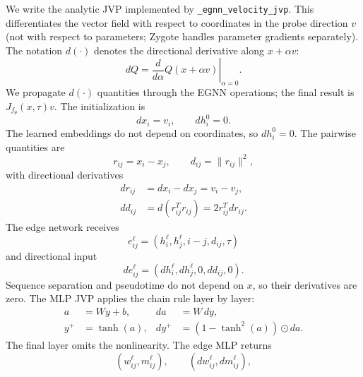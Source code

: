 \documentclass[reprint,amsmath,amssymb,aps,pra,10pt]{revtex4-2}
\begin{document}
We write the analytic JVP implemented by \texttt{\_egnn\_velocity\_jvp}.
This differentiates the vector field with respect to coordinates in the probe direction $v$ (not with respect to parameters; Zygote handles parameter gradients separately).
The notation $d(\cdot)$ denotes the directional derivative along $x+\alpha v$:
\begin{equation}
    dQ
    =
    \left.
    \frac{d}{d\alpha}
    Q(x+\alpha v)
    \right|_{\alpha=0}.
\end{equation}
We propagate $d(\cdot)$ quantities through the EGNN operations; the final result is $J_{f_\theta}(x,\tau)v$.
The initialization is
\begin{equation}
    dx_i=v_i,
    \qquad
    dh_i^0=0.
\end{equation}
The learned embeddings do not depend on coordinates, so $dh_i^0=0$.
The pairwise quantities are
\begin{equation}
    r_{ij}=x_i-x_j,
    \qquad
    d_{ij}=\|r_{ij}\|^2,
\end{equation}
with directional derivatives
\begin{equation}
    \begin{aligned}
        dr_{ij}
        &=
        dx_i-dx_j
        =
        v_i-v_j,
        \\
        dd_{ij}
        &=
        d(r_{ij}^T r_{ij})
        =
        2r_{ij}^Tdr_{ij}.
    \end{aligned}
\end{equation}
The edge network receives
\begin{equation}
    e_{ij}^\ell
    =
    \left(
        h_i^\ell,
        h_j^\ell,
        i-j,
        d_{ij},
        \tau
    \right)
\end{equation}
and directional input
\begin{equation}
    de_{ij}^\ell
    =
    \left(
        dh_i^\ell,
        dh_j^\ell,
        0,
        dd_{ij},
        0
    \right).
\end{equation}
Sequence separation and pseudotime do not depend on $x$, so their derivatives are zero.
The MLP JVP applies the chain rule layer by layer:
\begin{align}
    a &= W y + b,
    &
    da &= W\,dy,
    \\
    y^+ &= \tanh(a),
    &
    dy^+ &= \left(1-\tanh^2(a)\right)\odot da.
\end{align}
The final layer omits the nonlinearity.
The edge MLP returns
\begin{equation}
    (w_{ij}^\ell,m_{ij}^\ell),
    \qquad
    (dw_{ij}^\ell,dm_{ij}^\ell),
\end{equation}
\end{document}
